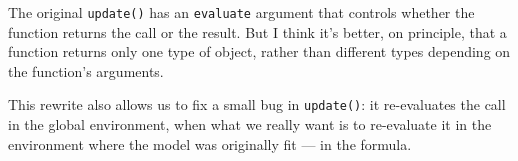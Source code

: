 \begin{Shaded}
\begin{Highlighting}[]
\StringTok{ }
  \StringTok{ }

    \StringTok{ }\NormalTok{(}
  \NormalTok{\}}

\NormalTok{\}}
\StringTok{ }
  \StringTok{ }
  \NormalTok{())}
\NormalTok{\}}
 \StringTok{ }\StringTok{ }
\CommentTok{#> }
\CommentTok{#> }
\end{Highlighting}
\end{Shaded}

The original \texttt{update()} has an \texttt{evaluate} argument that
controls whether the function returns the call or the result. But I
think it's better, on principle, that a function returns only one type
of object, rather than different types depending on the function's
arguments.

This rewrite also allows us to fix a small bug in \texttt{update()}: it
re-evaluates the call in the global environment, when what we really
want is to re-evaluate it in the environment where the model was
originally fit --- in the formula.

